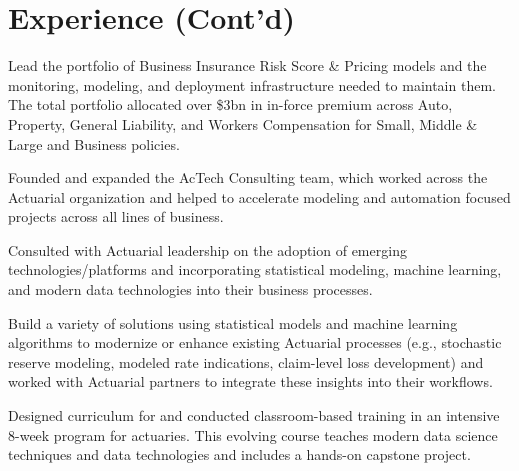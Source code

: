 \documentclass[letterpaper]{deedy-resume} %
\begin{document}


\begin{minipage}[t]{0.9\textwidth}
	\section{Experience (Cont'd)}
			\hfill
			\hfill{}
			\vspace{\topsep}
			\begin{tightitemize}
				\item Lead the portfolio of Business Insurance Risk Score \& Pricing models and the monitoring, modeling, and deployment infrastructure needed to maintain them. The total portfolio allocated over \$3bn in in-force premium across Auto, Property, General Liability, and Workers Compensation for Small, Middle \& Large and Business policies.
				\item Founded and expanded the AcTech Consulting team, which worked across the Actuarial organization and helped to accelerate modeling and automation focused projects across all lines of business. 
				\item Consulted with Actuarial leadership on the adoption of emerging technologies/platforms and incorporating statistical modeling, machine learning, and modern data technologies into their business processes.
				\item Build a variety of solutions using statistical models and machine learning algorithms to modernize or enhance existing Actuarial processes (e.g., stochastic reserve modeling, modeled rate indications, claim-level loss development) and worked with Actuarial partners to integrate these insights into their workflows.
				\item Designed curriculum for and conducted classroom-based training in an intensive 8-week program for actuaries. This evolving course teaches modern data science techniques and data technologies and includes a hands-on capstone project.
			\end{tightitemize}
		\sectionspace
		

\end{minipage}
\end{document}
